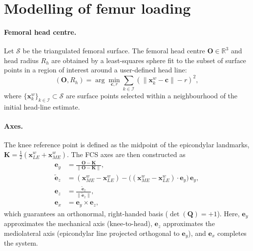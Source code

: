 \section{Modelling of femur loading}
\label{sec:femur_loading}
\paragraph{Femoral head centre.}
Let $\mathcal{S}$ be the triangulated femoral surface. The femoral head centre $\mathbf{O}\in\mathbb{R}^3$ and head radius $R_h$ are obtained by a least-squares sphere fit to the subset of surface points in a region of interest around a user-defined head line:
\begin{equation}
(\mathbf{O}, R_h)=\arg\min_{\mathbf{c},r}\sum_{k\in\mathcal{I}}\left(\lVert \mathbf{x}_k^w-\mathbf{c}\rVert - r\right)^2,
\label{eq:head_sphere_fit}
\end{equation}
where $\{\mathbf{x}_k^w\}_{k\in\mathcal{I}}\subset\mathcal{S}$ are surface points selected within a neighbourhood of the initial head-line estimate.

\paragraph{Axes.}
The knee reference point is defined as the midpoint of the epicondylar landmarks, $\mathbf{K}=\tfrac{1}{2}(\mathbf{x}_{LE}^w+\mathbf{x}_{ME}^w)$. The FCS axes are then constructed as
\begin{align}
\mathbf{e}_y &= \frac{\mathbf{O}-\mathbf{K}}{\lVert \mathbf{O}-\mathbf{K}\rVert}, \\
\tilde{\mathbf{e}}_z &= (\mathbf{x}_{ME}^w-\mathbf{x}_{LE}^w) - \big((\mathbf{x}_{ME}^w-\mathbf{x}_{LE}^w)\cdot \mathbf{e}_y\big)\,\mathbf{e}_y, \\
\mathbf{e}_z &= \frac{\tilde{\mathbf{e}}_z}{\lVert \tilde{\mathbf{e}}_z\rVert}, \\
\mathbf{e}_x &= \mathbf{e}_y \times \mathbf{e}_z,
\label{eq:fcs_axes}
\end{align}
which guarantees an orthonormal, right-handed basis ($\det(\mathbf{Q})=+1$). Here, $\mathbf{e}_y$ approximates the mechanical axis (knee-to-head), $\mathbf{e}_z$ approximates the mediolateral axis (epicondylar line projected orthogonal to $\mathbf{e}_y$), and $\mathbf{e}_x$ completes the system.

